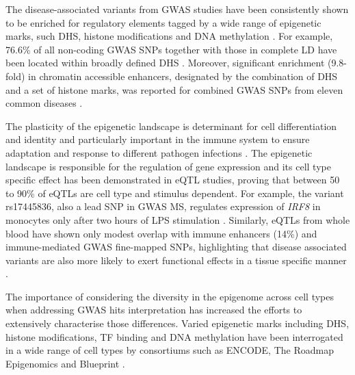The disease-associated variants from GWAS studies have been consistently shown to be enriched for regulatory elements tagged by a wide range of epigenetic marks, such DHS, histone modifications and DNA methylation . For example, 76.6\% of all non-coding GWAS SNPs together with those in complete LD have been located within broadly defined DHS \parencite{Maurano2012}. Moreover, significant enrichment (9.8-fold) in chromatin accessible enhancers, designated by the combination of DHS and a set of histone marks, was reported for combined GWAS SNPs from eleven common diseases \parencite{Gusev2014}. 

The plasticity of the epigenetic landscape is determinant for cell differentiation and identity and particularly important in the immune system to ensure adaptation and response to different pathogen infections \parencite{Yosef2016}. The epigenetic landscape is responsible for the regulation of gene expression and its cell type specific effect has been demonstrated in eQTL studies, proving that between 50 to 90\% of eQTLs are cell type and stimulus dependent\parencite{Dimas2009,Nica2011,Fairfax2012,Fairfax2014,Raj2014,Naranbhai2015,Kasela2017}. For example, the variant rs17445836, also a lead SNP in GWAS MS, regulates expression of \textit{IRF8} in monocytes only after two hours of LPS stimulation \parencite{Fairfax2014}. Similarly, eQTLs from whole blood have shown only modest overlap with immune enhancers (14\%) and immune-mediated GWAS fine-mapped SNPs, highlighting that disease associated variants are also more likely to exert functional effects in a tissue specific manner \parencite{Farh2014,Brown2013}.


The importance of considering the diversity in the epigenome across cell types when addressing GWAS hits interpretation has increased the efforts to extensively characterise those differences. Varied epigenetic marks including DHS, histone modifications, TF binding and DNA methylation have been interrogated in a wide range of cell types by consortiums such as ENCODE, The Roadmap Epigenomics and Blueprint \parencite{ENCODE2012,Bernstein2010,Adams2012}. 

